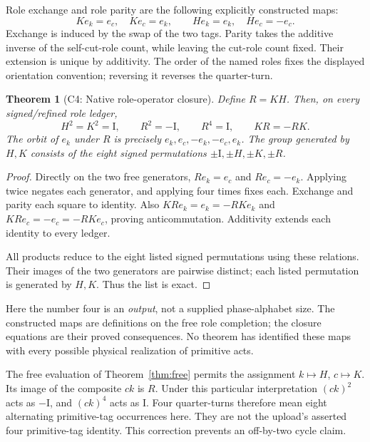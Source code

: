 \documentclass[11pt]{article}
\newtheorem{theorem}{Theorem}[section]
\newcommand{\Id}{\mathrm I}
\begin{document}
Role exchange and role parity are the following explicitly constructed maps:
\[
K e_k=e_c,\quad K e_c=e_k,\qquad
H e_k=e_k,\quad H e_c=-e_c.
\]
Exchange is induced by the swap of the two tags. Parity takes the additive
inverse of the self-cut-role count, while leaving the cut-role count fixed.
Their extension is unique by additivity. The order of the named roles fixes
the displayed orientation convention; reversing it reverses the quarter-turn.

\begin{theorem}[C4: Native role-operator closure]
\label{thm:roles}
Define $R=KH$. Then, on every signed/refined role ledger,
\[
H^2=K^2=\Id,\qquad R^2=-\Id,\qquad R^4=\Id,
\qquad KR=-RK.
\]
The orbit of $e_k$ under $R$ is precisely
$e_k,e_c,-e_k,-e_c,e_k$. The group generated by $H,K$ consists of the
eight signed permutations $\pm\Id,\pm H,\pm K,\pm R$.
\end{theorem}
\begin{proof}
Directly on the two free generators,
$Re_k=e_c$ and $Re_c=-e_k$. Applying twice negates each generator, and
applying four times fixes each. Exchange and parity each square to identity.
Also $KRe_k=e_k=-RKe_k$ and $KRe_c=-e_c=-RKe_c$, proving anticommutation.
Additivity extends each identity to every ledger.

All products reduce to the eight listed signed permutations using these
relations. Their images of the two generators are pairwise distinct; each
listed permutation is generated by $H,K$. Thus the list is exact.
\end{proof}
Here the number four is an \emph{output}, not a supplied phase-alphabet size.
The constructed maps are definitions on the free role completion; the
closure equations are their proved consequences. No theorem has identified
these maps with every possible physical realization of primitive acts.

The free evaluation of Theorem~\ref{thm:free} permits the assignment
$k\mapsto H$, $c\mapsto K$. Its image of the composite $ck$ is $R$.
Under this particular interpretation $(ck)^2$ acts as $-\Id$, and
$(ck)^4$ acts as $\Id$. Four quarter-turns therefore mean eight alternating
primitive-tag occurrences here. They are not the upload's asserted four
primitive-tag identity. This correction prevents an off-by-two cycle claim.
\end{document}
